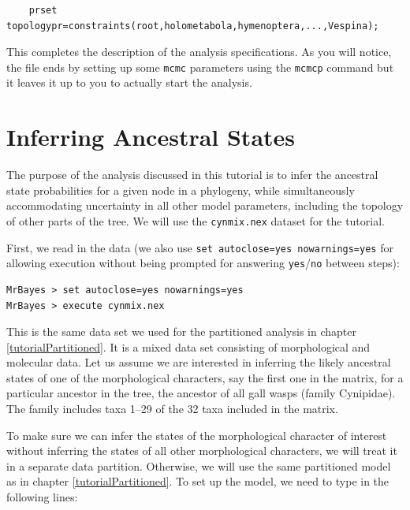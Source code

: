 \documentclass[12pt]{book}
\newcommand{\ttt}[1]{\texttt{#1}}
\begin{document}
\small
\begin{verbatim}
    prset topologypr=constraints(root,holometabola,hymenoptera,...,Vespina);
\end{verbatim}
\normalsize

This completes the description of the analysis specifications. As you will notice, the file ends by
setting up some \ttt{mcmc} parameters using the \ttt{mcmcp} command but it leaves it up to you to
actually start the analysis.

\section{Inferring Ancestral States}

The purpose of the analysis discussed in this tutorial is to infer the ancestral state
probabilities for a given node in a phylogeny, while simultaneously accommodating uncertainty in
all other model parameters, including the topology of other parts of the tree. We will use the
\ttt{cynmix.nex} dataset for the tutorial.

First, we read in the data (we also use \ttt{set autoclose=yes nowarnings=yes} for allowing
execution without being prompted for answering \ttt{yes}/\ttt{no} between steps):

\small
\begin{singlespacing}
\begin{verbatim}
MrBayes > set autoclose=yes nowarnings=yes
MrBayes > execute cynmix.nex
\end{verbatim}
\end{singlespacing}
\normalsize

This is the same data set we used for the partitioned analysis in chapter
\ref{tutorialPartitioned}. It is a mixed data set consisting of morphological and molecular data.
Let us assume we are interested in inferring the likely ancestral states of one of the
morphological characters, say the first one in the matrix, for a particular ancestor in the tree,
the ancestor of all gall wasps (family Cynipidae). The family includes taxa 1--29 of the 32 taxa
included in the matrix.

To make sure we can infer the states of the morphological character of interest without inferring
the states of all other morphological characters, we will treat it in a separate data partition.
Otherwise, we will use the same partitioned model as in chapter \ref{tutorialPartitioned}. To set
up the model, we need to type in the following lines:
\end{document}
